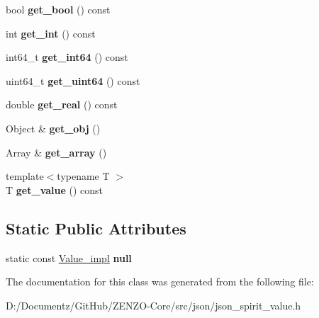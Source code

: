 \begin{DoxyCompactItemize}
\item 
\mbox{\label{classjson__spirit_1_1_value__impl_ae3ab14e7beb1f43d807043ce9e529a84}} 
bool {\bfseries get\+\_\+bool} () const
\item 
\mbox{\label{classjson__spirit_1_1_value__impl_affda8e0445171634575003c2b7c8e026}} 
int {\bfseries get\+\_\+int} () const
\item 
\mbox{\label{classjson__spirit_1_1_value__impl_ae80625f60275a1a82a0062d94ebe6590}} 
int64\+\_\+t {\bfseries get\+\_\+int64} () const
\item 
\mbox{\label{classjson__spirit_1_1_value__impl_a8bffeefd8f890d9d127fad58140fe366}} 
uint64\+\_\+t {\bfseries get\+\_\+uint64} () const
\item 
\mbox{\label{classjson__spirit_1_1_value__impl_aaf1750b45087fe3dd304cbbf72c2e131}} 
double {\bfseries get\+\_\+real} () const
\item 
\mbox{\label{classjson__spirit_1_1_value__impl_abd603895abad0753475601f5053e436f}} 
Object \& {\bfseries get\+\_\+obj} ()
\item 
\mbox{\label{classjson__spirit_1_1_value__impl_a77e326681a2ee973b8f46a1429494001}} 
Array \& {\bfseries get\+\_\+array} ()
\item 
\mbox{\label{classjson__spirit_1_1_value__impl_a4e125c023a1d92bbbf9eb4096d5dc6fa}} 
{\footnotesize template$<$typename T $>$ }\\T {\bfseries get\+\_\+value} () const
\end{DoxyCompactItemize}
\subsection*{Static Public Attributes}
\begin{DoxyCompactItemize}
\item 
\mbox{\label{classjson__spirit_1_1_value__impl_abb8ef4f2732e2c842afa716c456cb35d}} 
static const \mbox{\hyperlink{classjson__spirit_1_1_value__impl}{Value\+\_\+impl}} {\bfseries null}
\end{DoxyCompactItemize}


The documentation for this class was generated from the following file\+:\begin{DoxyCompactItemize}
\item 
D\+:/\+Documentz/\+Git\+Hub/\+Z\+E\+N\+Z\+O-\/\+Core/src/json/json\+\_\+spirit\+\_\+value.\+h\end{DoxyCompactItemize}
